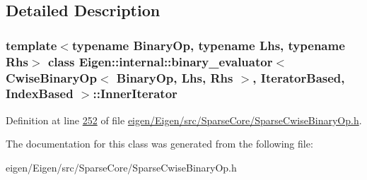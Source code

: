 \subsection{Detailed Description}
\subsubsection*{template$<$typename Binary\+Op, typename Lhs, typename Rhs$>$\newline
class Eigen\+::internal\+::binary\+\_\+evaluator$<$ Cwise\+Binary\+Op$<$ Binary\+Op, Lhs, Rhs $>$, Iterator\+Based, Index\+Based $>$\+::\+Inner\+Iterator}



Definition at line \hyperlink{eigen_2_eigen_2src_2_sparse_core_2_sparse_cwise_binary_op_8h_source_l00252}{252} of file \hyperlink{eigen_2_eigen_2src_2_sparse_core_2_sparse_cwise_binary_op_8h_source}{eigen/\+Eigen/src/\+Sparse\+Core/\+Sparse\+Cwise\+Binary\+Op.\+h}.



The documentation for this class was generated from the following file\+:\begin{DoxyCompactItemize}
\item 
eigen/\+Eigen/src/\+Sparse\+Core/\+Sparse\+Cwise\+Binary\+Op.\+h\end{DoxyCompactItemize}
